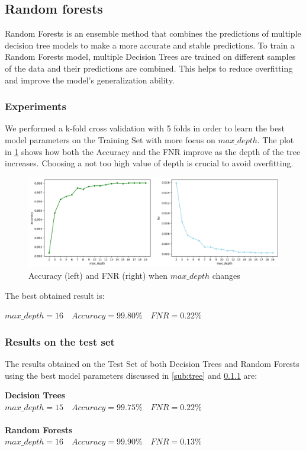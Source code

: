 \documentclass[twocolumn, switch]{article} %
\newcommand\x{0.7}
\begin{document}
\subsection{Random forests}
Random Forests is an ensemble method that combines the predictions of multiple decision tree models to make a more accurate and stable predictions.
To train a Random Forests model, multiple Decision Trees are trained on different samples of the data and their predictions are combined. This helps to reduce overfitting and improve the model's generalization ability.

\subsubsection{Experiments}
\label{sub:randomforest}
We performed a k-fold cross validation with 5 folds in order to learn the best model parameters on the Training Set with more focus on $max\_depth$. The plot in \ref{fig:foresttrain} shows how both the Accuracy and the FNR improve as the depth of the tree increases. Choosing a not too high value of depth is crucial to avoid overfitting.

\begin{figure}[ht!]
	\centering
	\includegraphics[width=\x\linewidth]{randomforest_accuracy_fnr.png}
	\caption{Accuracy (left) and FNR (right) when $max\_depth$ changes}
	\label{fig:foresttrain}
\end{figure}
The best obtained result is:
\begin{center}
	$max\_depth=16 \quad Accuracy=99.80\% \quad FNR=0.22\%$
\end{center}

\subsubsection{Results on the test set}
The results obtained on the Test Set of both Decision Trees and Random Forests using the best model parameters discussed in \ref{sub:tree} and \ref{sub:randomforest} are:
\begin{center}
	\textbf{Decision Trees}\\
	$max\_depth=15 \quad Accuracy=99.75\% \quad FNR=0.22\%$\\~\\
	\textbf{Random Forests}\\
	$max\_depth=16 \quad Accuracy=99.90\% \quad FNR=0.13\%$
\end{center}
\end{document}
